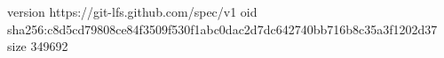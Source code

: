 version https://git-lfs.github.com/spec/v1
oid sha256:c8d5cd79808ce84f3509f530f1abc0dac2d7dc642740bb716b8c35a3f1202d37
size 349692
